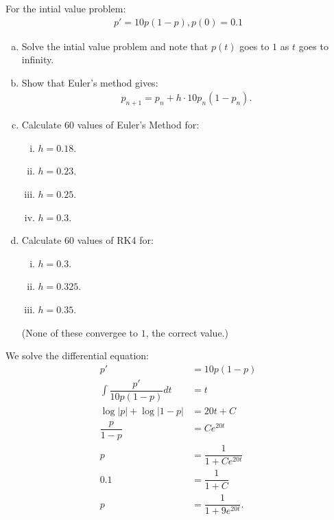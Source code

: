 \documentclass[11pt]{article}
\begin{document}
    \begin{problem}[Problem 2]
        For the intial value problem:
        \begin{align}
            p'=10p(1-p), p(0) = 0.1
        \end{align}
        \begin{enumerate}[(a)]
            \item Solve the intial value problem and note that $p(t)$ goes to $1$ as $t$ goes to infinity.
            \item Show that Euler's method gives:
            \begin{align}
                p_{n+1} = p_n + h \cdot 10p_n(1-p_n). 
            \end{align}
            \item Calculate 60 values of Euler's Method for:
            \begin{enumerate}[(i)]
                \item $h=0.18$.
                \item $h=0.23$.
                \item $h=0.25$.
                \item $h=0.3$.
            \end{enumerate}
            \item Calculate 60 values of RK4 for:
            \begin{enumerate}[(i)]
                \item $h=0.3$.
                \item $h=0.325$.
                \item $h=0.35$.
            \end{enumerate}
            (None of these convergee to $1$, the correct value.)
        \end{enumerate}
    \end{problem}
    \begin{solution}[Solution 2a]
        We solve the differential equation:
        \begin{align}
            p' &= 10p(1-p) \\
            \int \dfrac{p'}{10p(1-p)}dt &= t \\ 
            \log|p| + \log|1-p| &= 20t+C \\
            \dfrac{p}{1-p} &= Ce^{20t} \\
            p &= \dfrac{1}{1+Ce^{20t}} \\
            0.1 &= \dfrac{1}{1+C} \\
            p &= \dfrac{1}{1+9e^{20t}}.
        \end{align}
    \end{solution}
\end{document}

